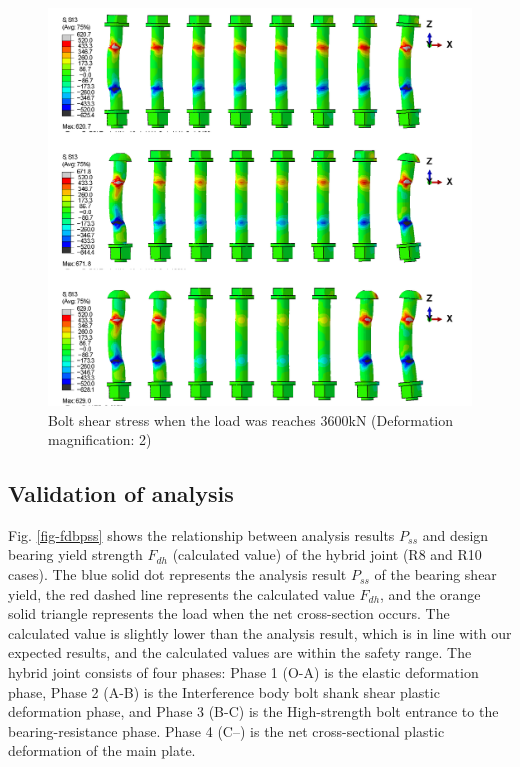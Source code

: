 \begin{figure}[htbp]
    \centering
    \includegraphics[width=\linewidth]{imgs/ch5/bshear_R8.png}
    \caption{Bolt shear stress when the load was reaches 3600kN (Deformation magnification: 2) }
    \label{fig-bshearr8}
\end{figure}

\subsection{Validation of analysis}

Fig. \ref{fig-fdbpss} shows the relationship between analysis results $P_{ss}$ and design bearing yield strength $F_{dh}$ (calculated value) of the hybrid joint (R8 and R10 cases). The blue solid dot represents the analysis result $P_{ss}$ of the bearing shear yield, the red dashed line represents the calculated value $F_{dh}$, and the orange solid triangle represents the load when the net cross-section occurs. The calculated value is slightly lower than the analysis result, which is in line with our expected results, and the calculated values are within the safety range. The hybrid joint consists of four phases: Phase 1 (O-A) is the elastic deformation phase, Phase 2 (A-B) is the Interference body bolt shank shear plastic deformation phase, and Phase 3 (B-C) is the High-strength bolt entrance to the bearing-resistance phase. Phase 4 (C–) is the net cross-sectional plastic deformation of the main plate. 

